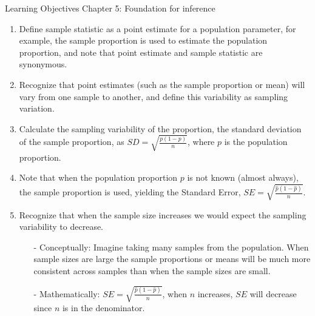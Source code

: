 \documentclass[11pt]{article}
\begin{document}
{\LARGE \textcolor{oiB}{Learning Objectives \hfill Chapter 5: Foundation for inference}} \\

%

\begin{enumerate}
\renewcommand\labelenumi{\textcolor{light}{\textbf{LO \theenumi.}}}

\item Define sample statistic as a point estimate for a population parameter, for example, the sample proportion is used to estimate the population proportion, and note that point estimate and sample statistic are synonymous.

\item Recognize that point estimates (such as the sample proportion or mean) will vary from one sample to another, and define this variability as sampling variation.

\item Calculate the sampling variability of the proportion, the standard deviation of the sample proportion, as $SD = \sqrt{\frac{p(1-p)}{n}}$, where $p$ is the population proportion.

\item Note that when the population proportion $p$ is not known (almost always), the sample proportion is used, yielding the Standard Error, $SE =\sqrt{\frac{\hat{p}(1-\hat{p})}{n}}$.


\item Recognize that when the sample size increases we would expect the sampling variability to decrease.
\begin{itemize}
\item[-] Conceptually: Imagine taking many samples from the population. When sample sizes are large the sample proportions or means will be much more consistent across samples than when the sample sizes are small.
\item[-] Mathematically: $SE =\sqrt{\frac{\hat{p}(1-\hat{p})}{n}}$, when $n$ increases, $SE$ will decrease since $n$ is in the denominator.
\end{itemize}

\end{enumerate}

%
\end{document}
